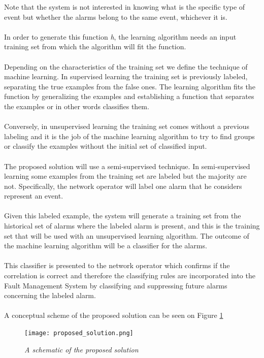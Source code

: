 \documentclass[10pt,a4paper]{article}
\begin{document}
Note that the system is not interested in knowing what is the specific type of event but whether the alarms belong to the same event, whichever it is.
\\\\
In order to generate this function \textit{h}, the learning algorithm needs an input training set from which the algorithm will fit the function.
\\\\
Depending on the characteristics of the training set we define the technique of machine learning. In supervised learning the training set is previously labeled, separating the true examples from the false ones. The learning algorithm fits the function by generalizing the examples and establishing a function that separates the examples or in other words classifies them.
\\\\
Conversely, in unsupervised learning the training set comes without a previous labeling and it is the job of the machine learning algorithm to try to find groups or classify the examples without the initial set of classified input.
\\\\
The proposed solution will use a semi-supervised technique. In semi-supervised learning some examples from the training set are labeled but the majority are not\cite{mlInNetworking}. Specifically, the network operator will label one alarm that he considers represent an event.
\\\\
Given this labeled example, the system will generate a training set from the historical set of alarms where the labeled alarm is present, and this is the training set that will be used with an unsupervised learning algorithm. The outcome of the machine learning algorithm will be a classifier for the alarms.
\\\\
This classifier is presented to the network operator which confirms if the correlation is correct and therefore the classifying rules are incorporated into the Fault Management System by classifying and suppressing future alarms concerning the labeled alarm.
\\\\
A conceptual scheme of the proposed solution can be seen on Figure \ref{fig:proposed_solution}

\begin{figure}[H]
 \texttt{[image: proposed\_solution.png]}
  \centering
  \caption{\textit{A schematic of the proposed solution}}
  \label{fig:proposed_solution}
\end{figure}	
\end{document}
